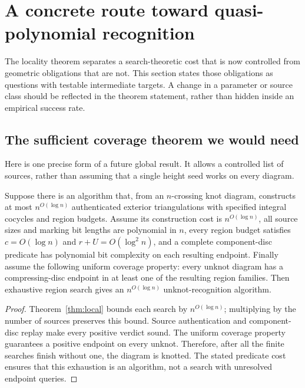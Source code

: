 \section{A concrete route toward quasi-polynomial recognition}\label{sec:research}

The locality theorem separates a search-theoretic cost that is now controlled
from geometric obligations that are not. This section states those obligations
as questions with testable intermediate targets. A change in a parameter or
source class should be reflected in the theorem statement, rather than hidden
inside an empirical success rate.

\subsection{The sufficient coverage theorem we would need}

Here is one precise form of a future global result. It allows a controlled
list of sources, rather than assuming that a single height seed works on
every diagram.

\begin{proposition}\label{prop:conditional}
Suppose there is an algorithm that, from an $n$-crossing knot diagram,
constructs at most $n^{O(\log n)}$ authenticated exterior triangulations with
specified integral cocycles and region budgets. Assume its construction
cost is $n^{O(\log n)}$, all source sizes and marking bit lengths are
polynomial in $n$, every region budget satisfies
$c=O(\log n)$ and $r+U=O(\log^2 n)$, and a complete component-disc predicate
has polynomial bit complexity on each resulting endpoint. Finally assume
the following uniform coverage property: every unknot diagram has a
compressing-disc endpoint in at least one of the resulting region families.
Then exhaustive region search gives an $n^{O(\log n)}$ unknot-recognition
algorithm.
\end{proposition}
\begin{proof}
Theorem~\ref{thm:local} bounds each search by $n^{O(\log n)}$; multiplying
by the number of sources preserves this bound. Source authentication and
component-disc replay make every positive verdict sound. The uniform
coverage property guarantees a positive endpoint on every unknot. Therefore,
after all the finite searches finish without one, the diagram is knotted.
The stated predicate cost ensures that this exhaustion is an algorithm,
not a search with unresolved endpoint queries.
\end{proof}


